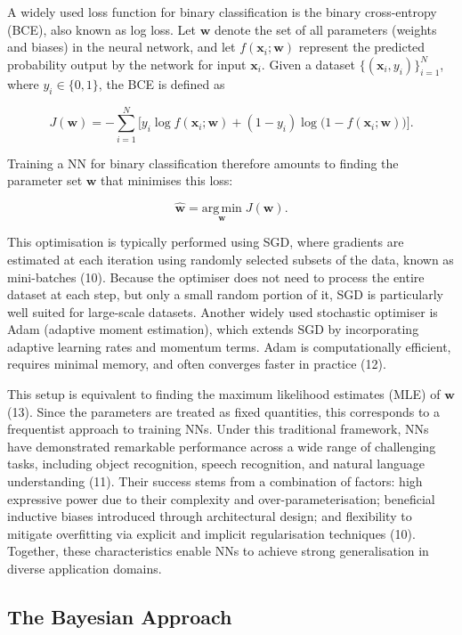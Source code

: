 \documentclass[
  a4paper,
]{scrreprt}
\begin{document}
A widely used loss function for binary classification is the binary
cross-entropy (BCE), also known as log loss. Let \(\mathbf{w}\) denote
the set of all parameters (weights and biases) in the neural network,
and let \(f(\mathbf{x}_i; \mathbf{w})\) represent the predicted
probability output by the network for input \(\mathbf{x}_i\). Given a
dataset \(\{(\mathbf{x}_i, y_i)\}_{i=1}^N\), where \(y_i \in \{0,1\}\),
the BCE is defined as

\[
J(\mathbf{w}) = -\sum_{i=1}^N \big[ y_i \log f(\mathbf{x}_i; \mathbf{w}) + (1-y_i) \log \big( 1 - f(\mathbf{x}_i; \mathbf{w}) \big) \big].
\]

Training a NN for binary classification therefore amounts to finding the
parameter set \(\mathbf{w}\) that minimises this loss:

\[
\hat{\mathbf{w}} = \underset{\mathbf{w}}{\mathrm{arg\,min}} \; J(\mathbf{w}).
\]

This optimisation is typically performed using SGD, where gradients are
estimated at each iteration using randomly selected subsets of the data,
known as mini-batches (10). Because the optimiser does not need to
process the entire dataset at each step, but only a small random portion
of it, SGD is particularly well suited for large-scale datasets. Another
widely used stochastic optimiser is Adam (adaptive moment estimation),
which extends SGD by incorporating adaptive learning rates and momentum
terms. Adam is computationally efficient, requires minimal memory, and
often converges faster in practice (12).

This setup is equivalent to finding the maximum likelihood estimates
(MLE) of \(\mathbf{w}\) (13). Since the parameters are treated as fixed
quantities, this corresponds to a frequentist approach to training NNs.
Under this traditional framework, NNs have demonstrated remarkable
performance across a wide range of challenging tasks, including object
recognition, speech recognition, and natural language understanding
(11). Their success stems from a combination of factors: high expressive
power due to their complexity and over-parameterisation; beneficial
inductive biases introduced through architectural design; and
flexibility to mitigate overfitting via explicit and implicit
regularisation techniques (10). Together, these characteristics enable
NNs to achieve strong generalisation in diverse application domains.

\subsection{The Bayesian Approach}\label{the-bayesian-approach}
\end{document}

